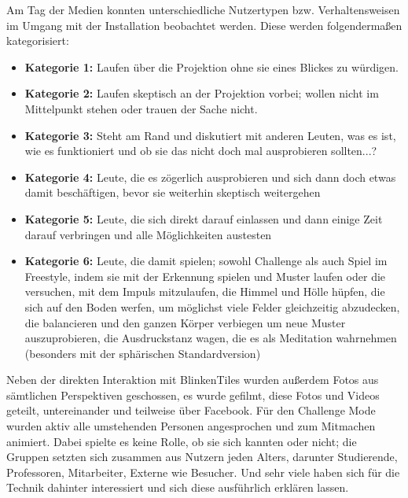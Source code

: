 
Am Tag der Medien konnten unterschiedliche Nutzertypen bzw. Verhaltensweisen im Umgang mit der Installation beobachtet werden. Diese werden folgendermaßen kategorisiert:\\

\begin{itemize}
	\item \textbf{Kategorie 1:} Laufen über die Projektion ohne sie eines Blickes zu würdigen.
	\item \textbf{Kategorie 2:} Laufen skeptisch an der Projektion vorbei; wollen nicht im Mittelpunkt stehen oder trauen der Sache nicht.
	\item \textbf{Kategorie 3:} Steht am Rand und diskutiert mit anderen Leuten, was es ist, wie es funktioniert und ob sie das nicht doch mal ausprobieren sollten...?
	\item \textbf{Kategorie 4:} Leute, die es zögerlich ausprobieren und sich dann doch etwas damit beschäftigen, bevor sie weiterhin skeptisch weitergehen
	\item \textbf{Kategorie 5:} Leute, die sich direkt darauf einlassen und dann einige Zeit darauf verbringen und alle Möglichkeiten austesten
	\item \textbf{Kategorie 6:} Leute, die damit spielen; sowohl Challenge als auch Spiel im Freestyle, indem sie mit der Erkennung spielen und Muster laufen oder die versuchen, mit dem Impuls mitzulaufen, die Himmel und Hölle hüpfen, die sich auf den Boden werfen, um möglichst viele Felder gleichzeitig abzudecken, die balancieren und den ganzen Körper verbiegen um neue Muster auszuprobieren, die Ausdruckstanz wagen, die es als Meditation wahrnehmen (besonders mit der sphärischen Standardversion)
\end{itemize}

Neben der direkten Interaktion mit BlinkenTiles wurden außerdem Fotos aus sämtlichen Perspektiven geschossen, es wurde gefilmt, diese Fotos und Videos geteilt, untereinander und teilweise über Facebook. Für den Challenge Mode wurden aktiv alle umstehenden Personen angesprochen und zum Mitmachen animiert. Dabei spielte es keine Rolle, ob sie sich kannten oder nicht; die Gruppen setzten sich zusammen aus Nutzern jeden Alters, darunter Studierende, Professoren, Mitarbeiter, Externe wie Besucher. Und sehr viele haben sich für die Technik dahinter interessiert und sich diese ausführlich erklären lassen.
